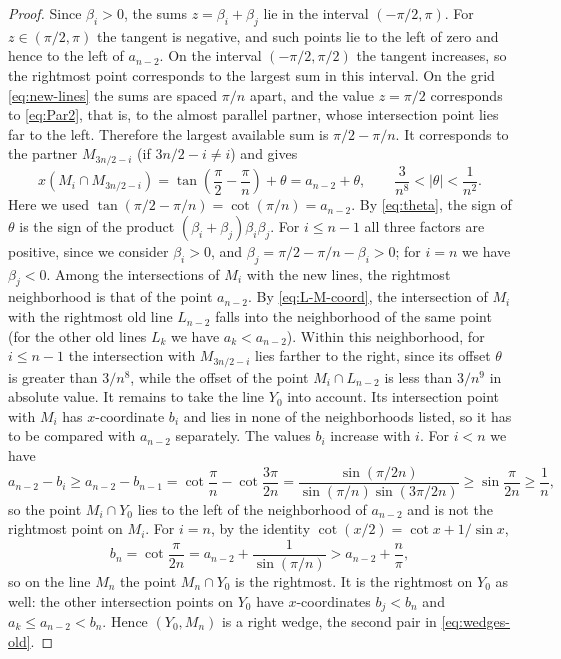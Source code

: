 \begin{proof}
Since $\beta_i>0$, the sums $z=\beta_i+\beta_j$ lie in the interval $(-\pi/2,\pi)$.
For $z\in(\pi/2,\pi)$ the tangent is negative, and such points lie to the left of zero and hence to the left of $a_{n-2}$.
On the interval $(-\pi/2,\pi/2)$ the tangent increases, so the rightmost point corresponds to the largest sum in this interval.
On the grid \eqref{eq:new-lines} the sums are spaced $\pi/n$ apart, and the value $z=\pi/2$ corresponds to \eqref{eq:Par2}, that is, to the almost parallel partner, whose intersection point lies far to the left.
Therefore the largest available sum is $\pi/2-\pi/n$.
It corresponds to the partner $M_{3n/2-i}$ (if $3n/2-i\neq i$) and gives
\[
x(M_i\cap M_{3n/2-i})=\tan\left(\frac\pi2-\frac\pi n\right)+\theta
=a_{n-2}+\theta,
\qquad \frac3{n^8}<|\theta|<\frac1{n^2} .
\]
Here we used $\tan(\pi/2-\pi/n)=\cot(\pi/n)=a_{n-2}$. By \eqref{eq:theta}, the sign of $\theta$ is the sign of the product $(\beta_i+\beta_j)\beta_i\beta_j$. For $i\le n-1$ all three factors are positive, since we consider $\beta_i>0$, and $\beta_j=\pi/2-\pi/n-\beta_i>0$; for $i=n$ we have $\beta_j<0$.
Among the intersections of $M_i$ with the new lines, the rightmost neighborhood is that of the point $a_{n-2}$. By \eqref{eq:L-M-coord}, the intersection of $M_i$ with the rightmost old line $L_{n-2}$ falls into the neighborhood of the same point (for the other old lines $L_k$ we have $a_k<a_{n-2}$).
Within this neighborhood, for $i\le n-1$ the intersection with $M_{3n/2-i}$ lies farther to the right, since its offset $\theta$ is greater than $3/n^{8}$, while the offset of the point $M_i\cap L_{n-2}$ is less than $3/n^{9}$ in absolute value.
It remains to take the line $Y_0$ into account. Its intersection point with $M_i$ has $x$-coordinate $b_i$ and lies in none of the neighborhoods listed, so it has to be compared with $a_{n-2}$ separately.
The values $b_i$ increase with $i$.
For $i<n$ we have
\[
a_{n-2}-b_i\ge a_{n-2}-b_{n-1}=\cot\frac\pi n-\cot\frac{3\pi}{2n}=\frac{\sin(\pi/2n)}{\sin(\pi/n)\sin(3\pi/2n)}\ge\sin\frac\pi{2n}\ge\frac1n,
\]
so the point $M_i\cap Y_0$ lies to the left of the neighborhood of $a_{n-2}$ and is not the rightmost point on $M_i$.
For $i=n$, by the identity $\cot(x/2)=\cot x+1/\sin x$,
\begin{equation}\label{eq:b-n}
b_n=\cot\frac\pi{2n}=a_{n-2}+\frac1{\sin(\pi/n)}>a_{n-2}+\frac n\pi,
\end{equation}
so on the line $M_n$ the point $M_n\cap Y_0$ is the rightmost.
It is the rightmost on $Y_0$ as well: the other intersection points on $Y_0$ have $x$-coordinates $b_j<b_n$ and $a_k\le a_{n-2}<b_n$.
Hence $(Y_0,M_n)$ is a right wedge, the second pair in \eqref{eq:wedges-old}.


\end{proof}

